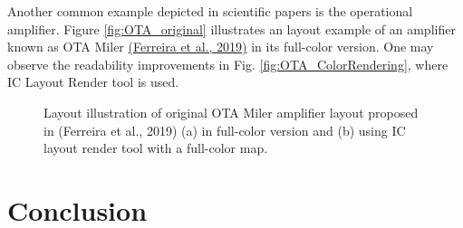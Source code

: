 \documentclass[10pt,a4paper,onecolumn]{article}
\begin{document}
Another common example depicted in scientific papers is the operational
amplifier. Figure \ref{fig:OTA_original} illustrates an layout example of an amplifier
known as OTA Miler \hyperlink{ref-Ferreira2019b}{(Ferreira et al., 2019)} in its full-color version.
One may observe the readability improvements in Fig. \ref{fig:OTA_ColorRendering}, where IC
Layout Render tool is used.
\begin{figure}
 \begin{center}
   \caption{Layout illustration of original OTA Miler amplifier layout
proposed in (Ferreira et al., 2019) (a) in full-color version and (b)
using IC layout render tool with a full-color map.}
 \end{center}
\end{figure}


\hypertarget{conclusion}{%
\section{Conclusion}\label{conclusion}}
\end{document}
